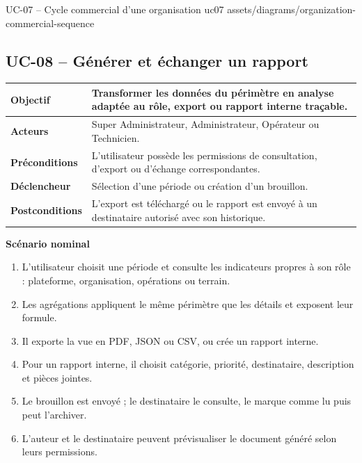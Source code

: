 \UseCaseUmlPlate
  {UC-07 -- Cycle commercial d'une organisation}
  {uc07}
  {assets/diagrams/organization-commercial-sequence}

\subsection{UC-08 -- Générer et échanger un rapport}

\begin{table}[H]
  \centering
  \begin{tabularx}{\textwidth}{|C{3.3cm}|Y|}
    \hline
    \textbf{Objectif} & Transformer les données du périmètre en analyse adaptée au
    rôle, export ou rapport interne traçable.\\\hline
    \textbf{Acteurs} & Super Administrateur, Administrateur, Opérateur ou Technicien.\\\hline
    \textbf{Préconditions} & L'utilisateur possède les permissions de consultation,
    d'export ou d'échange correspondantes.\\\hline
    \textbf{Déclencheur} & Sélection d'une période ou création d'un brouillon.\\\hline
    \textbf{Postconditions} & L'export est téléchargé ou le rapport est envoyé à un
    destinataire autorisé avec son historique.\\\hline

  \end{tabularx}
\end{table}

\textbf{Scénario nominal}
\begin{enumerate}[leftmargin=8mm]
  \item L'utilisateur choisit une période et consulte les indicateurs propres à son
  rôle : plateforme, organisation, opérations ou terrain.
  \item Les agrégations appliquent le même périmètre que les détails et exposent leur
  formule.
  \item Il exporte la vue en PDF, JSON ou CSV, ou crée un rapport interne.
  \item Pour un rapport interne, il choisit catégorie, priorité, destinataire,
  description et pièces jointes.
  \item Le brouillon est envoyé ; le destinataire le consulte, le marque comme lu puis
  peut l'archiver.
  \item L'auteur et le destinataire peuvent prévisualiser le document généré selon
  leurs permissions.
\end{enumerate}


